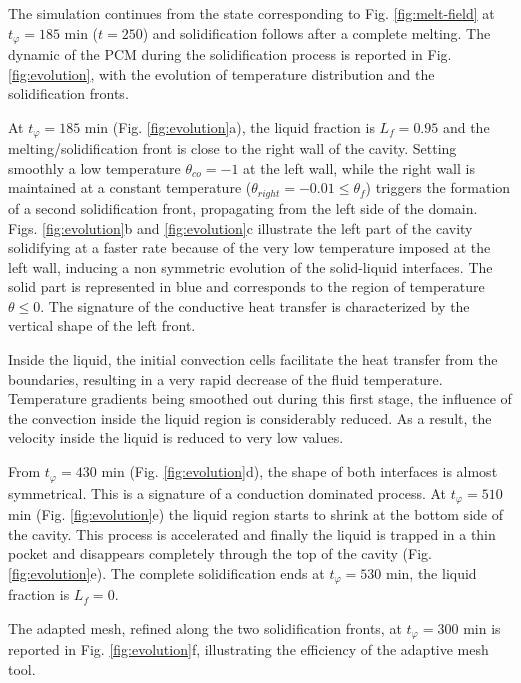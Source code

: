 The simulation continues from the state corresponding to Fig.  \ref{fig:melt-field} at $t_{\varphi} =185$ min ($t=250$) and solidification follows after a complete melting. 
The dynamic of the PCM during the solidification process is reported in Fig. \ref{fig:evolution}, with the evolution of temperature distribution and the solidification fronts.

At  $t_{\varphi}  =185$ min     (Fig. \ref{fig:evolution}a), the liquid fraction is $L_f=0.95$ and the melting/solidification front is close to the right wall of the cavity. 
Setting smoothly a low temperature $\theta_{co} = -1$ at the left wall, while the right wall is maintained at a constant temperature ($\theta_{right} = -0.01 \leq \theta_f$) triggers the formation of a second solidification front, propagating from the left side of the domain. \\
Figs. \ref{fig:evolution}b and \ref{fig:evolution}c illustrate the left part of the cavity solidifying at a faster rate because of the very low temperature imposed at the left wall, inducing a non symmetric evolution of the solid-liquid interfaces.
The solid part is represented in blue and corresponds to the region of temperature $\theta \leq 0$.
The signature of the conductive heat transfer is characterized by the vertical shape of the left front.

Inside the liquid, the initial convection cells facilitate the heat transfer from the boundaries, resulting in a very rapid decrease of the fluid temperature. 
Temperature gradients being smoothed out during this first stage, the influence of the convection inside the liquid region is considerably reduced. As a result, the velocity inside the liquid is reduced to very low values. 

From $t_{\varphi} = 430$ min (Fig. \ref{fig:evolution}d), the shape of both interfaces is almost symmetrical. 
This is a signature of a conduction dominated process. 
At $t_{\varphi} = 510$ min (Fig. \ref{fig:evolution}e) the liquid region starts to shrink at the bottom side of the cavity. 
This process is accelerated and finally the liquid is trapped in a thin pocket and disappears completely through the top of the cavity (Fig. \ref{fig:evolution}e). 
The complete solidification ends at $t_{\varphi} = 530$ min, \ie the liquid fraction is $L_f=0$.  

The adapted mesh, refined along the two solidification fronts, at $t_{\varphi} = 300$ min is reported in Fig. \ref{fig:evolution}f, illustrating the efficiency of the adaptive mesh tool.


